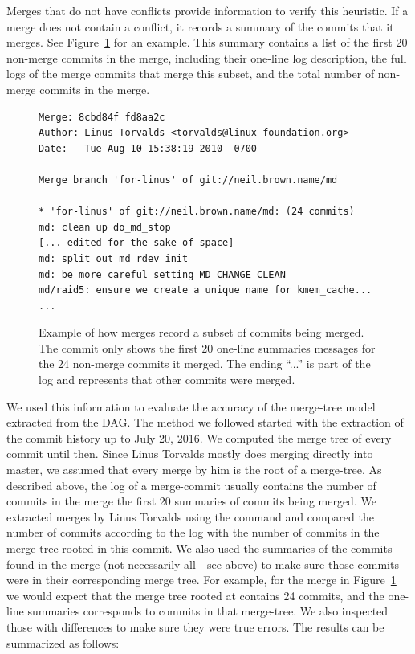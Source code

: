 \documentclass[draft]{IEEEtran}
\begin{document}
Merges that do not have conflicts provide information to verify this
heuristic. If a merge does not contain a conflict, it records a summary
of the commits that it merges. See Figure~\ref{fig:sampleMerge} for an
example. This summary contains a list of the first 20 non-merge commits
in the merge, including their one-line log description, the full logs of
the merge commits that merge this subset, and the total number of
non-merge commits in the merge.

\begin{figure}[htbp]
        \centering
        {\fontsize{7}{9}
        \begin{verbatim}
Merge: 8cbd84f fd8aa2c
Author: Linus Torvalds <torvalds@linux-foundation.org>
Date:   Tue Aug 10 15:38:19 2010 -0700

Merge branch 'for-linus' of git://neil.brown.name/md

* 'for-linus' of git://neil.brown.name/md: (24 commits)
md: clean up do_md_stop
[... edited for the sake of space]
md: split out md_rdev_init
md: be more careful setting MD_CHANGE_CLEAN
md/raid5: ensure we create a unique name for kmem_cache...
...
        \end{verbatim}}\vspace{-5mm}
        \caption{Example of how merges record a subset of commits being merged. The
                commit only shows the first 20 one-line summaries messages for the 24
                non-merge commits it merged. The ending ``...'' is part of the log
                and represents that other commits were merged.}
        \label{fig:sampleMerge}
\end{figure}



We used this information to evaluate the accuracy of the merge-tree
model extracted from the DAG. The method we followed started with the
extraction of the commit history up to July 20, 2016. We computed the
merge tree of every commit until then. Since Linus Torvalds mostly does
merging directly into master, we assumed that every merge by him is the
root of a merge-tree. As described above, the log of a merge-commit
usually contains the number of commits in the merge the first 20
summaries of commits being merged. We extracted merges by Linus Torvalds
using the command  and compared
the number of commits according to the log with the number of commits in
the  merge-tree rooted in this commit. We also used the summaries of the
commits found in the merge (not necessarily all---see above) to make
sure those commits were in their corresponding merge tree. For example,
for the merge in Figure~\ref{fig:sampleMerge} we would expect that the
merge tree rooted at  contains 24 commits, and the
one-line summaries corresponds to commits in that merge-tree. We also
inspected those with differences to make sure they were true errors.
The results can be summarized as follows:
\end{document}
